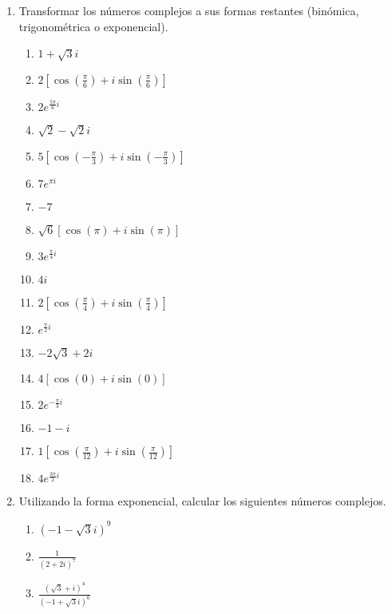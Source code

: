 \documentclass[a4paper]{article}
\newcommand{\exercise}{\item}
\newcommand{\df}[2]{\displaystyle\frac{#1}{#2}}
\newcommand{\cis}[1]{\left[\cos\left({#1}\right)+i\sin\left({#1}\right)\right]}
\begin{document}
\begin{enumerate}
\begin{multicols}{3}
\begin{enumerate} [label=(\alph*)]
		\item $3$
		\item $2i$
		\item $-1$
		\item $-5i$
		\item $-\sqrt{2}$
		\item $4i+2$
		\item $1+\sqrt{2}$
		\item $-\df{1}{2}+\df{3}{4}i$
		\item $i-4$
		\item $1+\sqrt{2}-\sqrt{3}i$
	\end{enumerate}
	\end{multicols}
	\exercise Transformar los números complejos a sus formas restantes (binómica, trigonométrica o exponencial).
	\begin{multicols}{3}
	\begin{enumerate} [label=(\alph*)]
		\item $1+\sqrt{3}i$
		\item $2 \cis{\df{\pi}{6}}$
		\item $2e^{\frac{5\pi}{6}i}$
		\item $\sqrt{2}-\sqrt{2}i$
		\item $5 \cis{-\df{\pi}{3}}$
		\item $7e^{\pi i}$
		\item $-7$
		\item $\sqrt{6}\cis{\pi}$
		\item $3e^{\frac{\pi}{4}i}$
		\item $4i$
		\item $2\cis{\df{\pi}{4}}$
		\item $e^{\frac{\pi}{2}i}$
		\item $-2\sqrt{3}+2i$
		\item $4\cis{0}$
		\item $2e^{-\frac{\pi}{3}i}$
		\item $-1-i$
		\item $1\cis{\df{\pi}{12}}$
		\item $4e^{\frac{3\pi}{2}i}$
	\end{enumerate}
	\end{multicols}
	\exercise Utilizando la forma exponencial, calcular los siguientes números complejos.
	\begin{multicols}{2}
	\begin{enumerate} [label=(\alph*)]
		\item $(-1-\sqrt{3}i)^9$
		\item $\df{1}{(2+2i)^7}$
		\item $\df{(\sqrt{3}+i)^4}{(-1+\sqrt{3}i)^6}$

\end{enumerate}
\end{multicols}
\end{enumerate}
\end{document}
